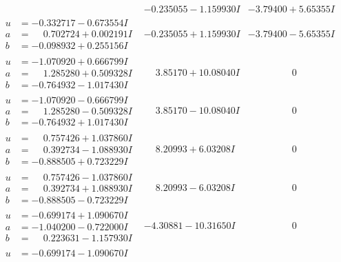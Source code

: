 \documentclass[1p]{elsarticle_modified}
\theoremstyle{definition}
\begin{document}
$$\begin{array}{c|c|c}
 & -0.235055 - 1.159930 I & -3.79400 + 5.65355 I \\ \hline\begin{aligned}
u &= -0.332717 - 0.673554 I \\
a &= \phantom{-}0.702724 + 0.002191 I \\
b &= -0.098932 + 0.255156 I\end{aligned}
 & -0.235055 + 1.159930 I & -3.79400 - 5.65355 I \\ \hline\begin{aligned}
u &= -1.070920 + 0.666799 I \\
a &= \phantom{-}1.285280 + 0.509328 I \\
b &= -0.764932 - 1.017430 I\end{aligned}
 & \phantom{-}3.85170 + 10.08040 I & \phantom{-0.000000 } 0 \\ \hline\begin{aligned}
u &= -1.070920 - 0.666799 I \\
a &= \phantom{-}1.285280 - 0.509328 I \\
b &= -0.764932 + 1.017430 I\end{aligned}
 & \phantom{-}3.85170 - 10.08040 I & \phantom{-0.000000 } 0 \\ \hline\begin{aligned}
u &= \phantom{-}0.757426 + 1.037860 I \\
a &= \phantom{-}0.392734 - 1.088930 I \\
b &= -0.888505 + 0.723229 I\end{aligned}
 & \phantom{-}8.20993 + 6.03208 I & \phantom{-0.000000 } 0 \\ \hline\begin{aligned}
u &= \phantom{-}0.757426 - 1.037860 I \\
a &= \phantom{-}0.392734 + 1.088930 I \\
b &= -0.888505 - 0.723229 I\end{aligned}
 & \phantom{-}8.20993 - 6.03208 I & \phantom{-0.000000 } 0 \\ \hline\begin{aligned}
u &= -0.699174 + 1.090670 I \\
a &= -1.040200 - 0.722000 I \\
b &= \phantom{-}0.223631 - 1.157930 I\end{aligned}
 & -4.30881 - 10.31650 I & \phantom{-0.000000 } 0 \\ \hline\begin{aligned}
u &= -0.699174 - 1.090670 I \\

\end{aligned}
\end{array}$$
\end{document}
